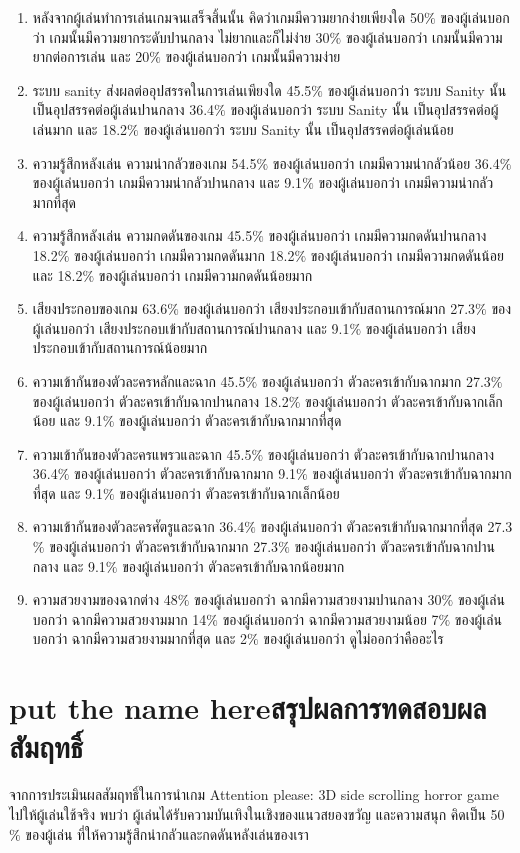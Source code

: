 \begin{enumerate}
    \item หลังจากผู้เล่นทำการเล่นเกมจนเสร็จสิ้นนั้น คิดว่าเกมมีความยากง่ายเพียงใด 50$\%$ ของผู้เล่นบอกว่า เกมนั้นมีความยากระดับปานกลาง ไม่ยากและก็ไม่ง่าย 30$\%$ ของผู้เล่นบอกว่า เกมนั้นมีความยากต่อการเล่น และ 20$\%$ ของผู้เล่นบอกว่า เกมนั้นมีความง่าย
    \item ระบบ sanity ส่งผลต่ออุปสรรคในการเล่นเพียงใด 45.5$\%$ ของผู้เล่นบอกว่า ระบบ Sanity นั้น เป็นอุปสรรคต่อผู้เล่นปานกลาง 36.4$\%$ ของผู้เล่นบอกว่า ระบบ Sanity นั้น เป็นอุปสรรคต่อผู้เล่นมาก และ 18.2$\%$ ของผู้เล่นบอกว่า ระบบ Sanity นั้น เป็นอุปสรรคต่อผู้เล่นน้อย
    \item ความรู้สึกหลังเล่น ความน่ากลัวของเกม 54.5$\%$ ของผู้เล่นบอกว่า เกมมีความน่ากลัวน้อย 36.4$\%$ ของผู้เล่นบอกว่า เกมมีความน่ากลัวปานกลาง และ 9.1$\%$ ของผู้เล่นบอกว่า เกมมีความน่ากลัวมากที่สุด
    \item ความรู้สึกหลังเล่น ความกดดันของเกม 45.5$\%$ ของผู้เล่นบอกว่า เกมมีความกดดันปานกลาง 18.2$\%$ ของผู้เล่นบอกว่า เกมมีความกดดันมาก 18.2$\%$ ของผู้เล่นบอกว่า เกมมีความกดดันน้อย และ 18.2$\%$ ของผู้เล่นบอกว่า เกมมีความกดดันน้อยมาก
    \item เสียงประกอบของเกม 63.6$\%$ ของผู้เล่นบอกว่า เสียงประกอบเข้ากับสถานการณ์มาก 27.3$\%$ ของผู้เล่นบอกว่า เสียงประกอบเข้ากับสถานการณ์ปานกลาง และ 9.1$\%$ ของผู้เล่นบอกว่า เสียงประกอบเข้ากับสถานการณ์น้อยมาก
    \item ความเข้ากันของตัวละครหลักและฉาก 45.5$\%$ ของผู้เล่นบอกว่า ตัวละครเข้ากับฉากมาก 27.3$\%$ ของผู้เล่นบอกว่า ตัวละครเข้ากับฉากปานกลาง 18.2$\%$ ของผู้เล่นบอกว่า ตัวละครเข้ากับฉากเล็กน้อย และ 9.1$\%$ ของผู้เล่นบอกว่า ตัวละครเข้ากับฉากมากที่สุด
    \item ความเข้ากันของตัวละครแพรวและฉาก 45.5$\%$ ของผู้เล่นบอกว่า ตัวละครเข้ากับฉากปานกลาง 36.4$\%$ ของผู้เล่นบอกว่า ตัวละครเข้ากับฉากมาก 9.1$\%$ ของผู้เล่นบอกว่า ตัวละครเข้ากับฉากมากที่สุด และ 9.1$\%$ ของผู้เล่นบอกว่า ตัวละครเข้ากับฉากเล็กน้อย
    \item ความเข้ากันของตัวละครศัตรูและฉาก 36.4$\%$ ของผู้เล่นบอกว่า ตัวละครเข้ากับฉากมากที่สุด 27.3$\%$ ของผู้เล่นบอกว่า ตัวละครเข้ากับฉากมาก 27.3$\%$ ของผู้เล่นบอกว่า ตัวละครเข้ากับฉากปานกลาง และ 9.1$\%$ ของผู้เล่นบอกว่า ตัวละครเข้ากับฉากน้อยมาก
    \item ความสวยงามของฉากต่าง 48$\%$ ของผู้เล่นบอกว่า ฉากมีความสวยงามปานกลาง 30$\%$ ของผู้เล่นบอกว่า ฉากมีความสวยงามมาก 14$\%$ ของผู้เล่นบอกว่า ฉากมีความสวยงามน้อย 7$\%$ ของผู้เล่นบอกว่า ฉากมีความสวยงามมากที่สุด และ 2$\%$ ของผู้เล่นบอกว่า ดูไม่ออกว่าคืออะไร
\end{enumerate}

\section{\ifenglish put the name here\else สรุปผลการทดสอบผลสัมฤทธิ์\fi}


จากการประเมินผลสัมฤทธิ์ในการนำเกม Attention please: 3D side scrolling horror game ไปให้ผู้เล่นใช้จริง พบว่า ผู้เล่นได้รับความบันเทิงในเชิงของแนวสยองขวัญ และความสนุก คิดเป็น 50$\%$ ของผู้เล่น ที่ให้ความรู้สึกน่ากลัวและกดดันหลังเล่นของเรา
